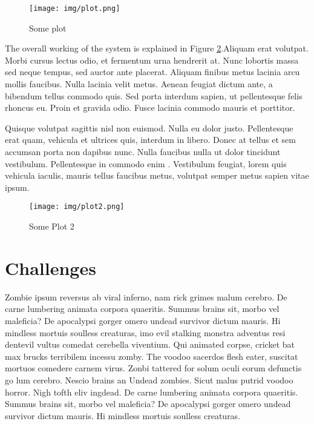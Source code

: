 \documentclass[11pt]{article}
\begin{document}
\begin{figure}[H]
    \centering
    \texttt{[image: img/plot.png]}
    \caption{Some plot}
    \label{fig:Confidence_1}
\end{figure}

The overall working of the system is explained in Figure \ref{fig:Confidence_2}.Aliquam erat volutpat. Morbi cursus lectus odio, et fermentum urna hendrerit at. Nunc lobortis massa sed neque tempus, sed auctor ante placerat. Aliquam finibus metus lacinia arcu mollis faucibus. Nulla lacinia velit metus. Aenean feugiat dictum ante, a bibendum tellus commodo quis. Sed porta interdum sapien, ut pellentesque felis rhoncus eu. Proin et gravida odio. Fusce lacinia commodo mauris et porttitor.

Quisque volutpat sagittis nisl non euismod. Nulla eu dolor justo. Pellentesque erat quam, vehicula et ultrices quis, interdum in libero. Donec at tellus et sem accumsan porta non dapibus nunc. Nulla faucibus nulla ut dolor tincidunt vestibulum. Pellentesque in commodo enim \cite{hendrycks2019using}. Vestibulum feugiat, lorem quis vehicula iaculis, mauris tellus faucibus metus, volutpat semper metus sapien vitae ipsum.

\begin{figure}[H]
    \centering
    \texttt{[image: img/plot2.png]}
    \caption{Some Plot 2}
    \label{fig:Confidence_2}
\end{figure}



\section{Challenges}

Zombie ipsum reversus ab viral inferno, nam rick grimes malum cerebro. De carne lumbering animata corpora quaeritis. Summus brains sit, morbo vel maleficia? De apocalypsi gorger omero undead survivor dictum mauris. Hi mindless mortuis soulless creaturas, imo evil stalking monstra adventus resi dentevil vultus comedat cerebella viventium. Qui animated corpse, cricket bat max brucks terribilem incessu zomby. The voodoo sacerdos flesh eater, suscitat mortuos comedere carnem virus. Zonbi tattered for solum oculi eorum defunctis go lum cerebro. Nescio brains an Undead zombies. Sicut malus putrid voodoo horror. Nigh tofth eliv ingdead. De carne lumbering animata corpora quaeritis. Summus brains sit, morbo vel maleficia? De apocalypsi gorger omero undead survivor dictum mauris. Hi mindless mortuis soulless creaturas.
\end{document}
